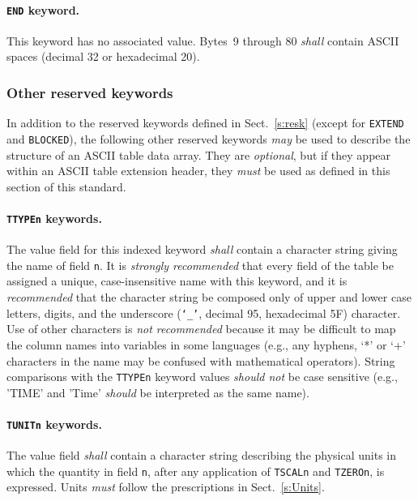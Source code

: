\documentclass[onecolumn]{aa}
\begin{document}
   \paragraph{{\tt END} keyword.}
 This keyword has no associated value.  Bytes~9 through 80
 {\em shall} contain ASCII spaces (decimal 32 or hexadecimal 20).
  
 \subsubsection{Other reserved keywords}
 \label{s:atork}
  In addition to the reserved keywords defined in  Sect.\ \ref{s:resk} (except for {\tt EXTEND}
   and {\tt BLOCKED}), 
   the following other reserved keywords {\em may} be 
   used to describe the structure of an
  ASCII table data array. They are {\em optional}, but if they
  appear within an ASCII table extension header, they {\em must}
  be used as defined in this section of this standard. 

   \paragraph{{\tt TTYPEn} keywords.} 
 The value field for this indexed keyword {\em shall} contain a
 character string giving the name of field {\tt n}.  
 It is {\em strongly recommended} that every field of the table be 
 assigned a unique, case-insensitive  name with this keyword, and it is 
 {\em recommended} that the character string be composed only of upper and 
 lower case letters, digits, and the underscore ({\tt `\_'}, decimal 95, 
 hexadecimal 5F) character.  Use of other characters is {\em not recommended} 
 because it may be difficult to map the column names into variables in some
 languages (e.g., any hyphens, `*'  or `+' characters in the name may be confused
 with mathematical operators).
 String comparisons with the {\tt TTYPEn} keyword values {\em should not}
 be case sensitive (e.g., 'TIME' and 'Time' {\em should} be interpreted as the 
 same name).
 
   \paragraph{{\tt TUNITn} keywords.}
 The value field {\em shall} contain a character 
 string describing the physical units 
 in which the quantity in field 
 {\tt n}, after any application of {\tt TSCALn}
 and {\tt TZEROn}, is expressed. Units {\em must} follow the 
 prescriptions in Sect.\ \ref{s:Units}.  
\end{document}
